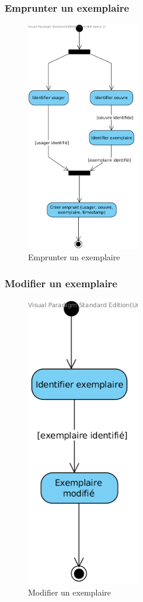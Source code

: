 \documentclass[a4paper,12pt]{article}
\begin{document}
\clearpage
\subsubsection{Emprunter un exemplaire}
\label{sec:orgheadline24}

\begin{figure}[!htpb]
\centering
\includegraphics[width=5cm]{./res/img/emprunter-exemplaire.png}
\caption{\label{fig:orgparagraph15}
Emprunter un exemplaire}
\end{figure}

\clearpage
\subsubsection{Modifier un exemplaire}
\label{sec:orgheadline25}

\begin{figure}[!htpb]
\centering
\includegraphics[width=5cm]{./res/img/modifier-exemplaire.png}
\caption{\label{fig:orgparagraph16}
Modifier un exemplaire}
\end{figure}
\end{document}
